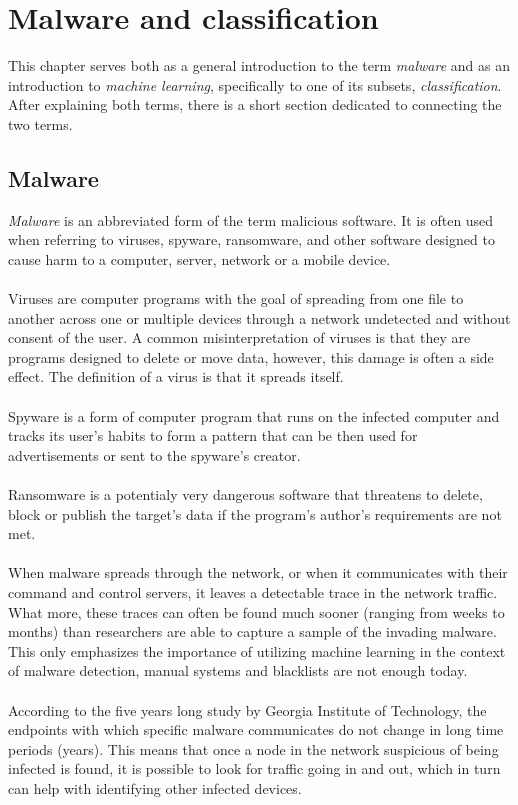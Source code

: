 \documentclass[11pt]{article}
\begin{document}
  \section{Malware and classification}
      This chapter serves both as a general introduction to the term {\it malware} and as an introduction to {\it machine learning}, specifically to one of its subsets, {\it classification}. After explaining both terms, there is a short section dedicated to connecting the two terms.
    \subsection{Malware}
      {\it Malware} is an abbreviated form of the term malicious software. It is often used when referring to viruses, spyware, ransomware, and other software designed to cause harm to a computer, server, network or a mobile device. \cite{malware}
      \\~\\
      Viruses are computer programs with the goal of spreading from one file to another across one or multiple devices through a network undetected and without consent of the user. A common misinterpretation of viruses is that they are programs designed to delete or move data, however, this damage is often a side effect. The definition of a virus is that it spreads itself. \cite{malware}
      \\~\\
      Spyware is a form of computer program that runs on the infected computer and tracks its user's habits to form a pattern that can be then used for advertisements or sent to the spyware's creator. \cite{malware}
      \\~\\
      Ransomware is a potentialy very dangerous software that threatens to delete, block or publish the target's data if the program's author's requirements are not met. \cite{ransomware}
      \\~\\
      When malware spreads through the network, or when it communicates with their command and control servers, it leaves a detectable trace in the network traffic. What more, these traces can often be found much sooner (ranging from weeks to months) than researchers are able to capture a sample of the invading malware. \cite{network} This only emphasizes the importance of utilizing machine learning in the context of malware detection, manual systems and blacklists are not enough today.
      \\~\\
      According to the five years long study by Georgia Institute of Technology, the endpoints with which specific malware communicates do not change in long time periods (years). This means that once a node in the network suspicious of being infected is found, it is possible to look for traffic going in and out, which in turn can help with identifying other infected devices. \cite{network}
\end{document}
